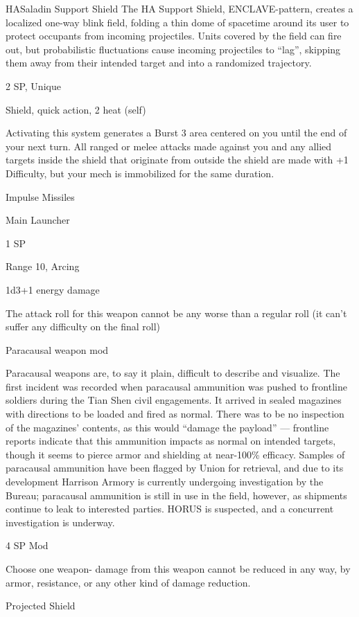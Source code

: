\begin{mech}{HA}{Saladin}
Support Shield
The HA Support Shield, ENCLAVE-pattern, creates a localized one-way blink field, folding a thin dome of spacetime around its user to protect occupants from incoming projectiles. Units covered by the field can fire out, but probabilistic fluctuations cause incoming projectiles to “lag”, skipping them away from their intended target and into a randomized trajectory.

2 SP, Unique

Shield, quick action, 2 heat (self)

Activating this system generates a Burst 3 area centered on you until the end of your next turn. All ranged or melee attacks made against you and any allied targets inside the shield that originate from outside the shield are made with +1 Difficulty, but your mech is immobilized for the same duration.


Impulse Missiles

Main Launcher

1 SP

Range 10, Arcing

1d3+1 energy damage

The attack roll for this weapon cannot be any worse than a regular roll (it can’t suffer any difficulty on the final roll)


Paracausal weapon mod

Paracausal weapons are, to say it plain, difficult to describe and visualize. The first incident was recorded when paracausal ammunition was pushed to frontline soldiers during the Tian Shen civil engagements. It arrived in sealed magazines with directions to be loaded and fired as normal. There was to be no inspection of the magazines’ contents, as this would “damage the payload” — frontline reports indicate that this ammunition impacts as normal on intended targets, though it seems to pierce armor and shielding at near-100\% efficacy. Samples of paracausal ammunition have been flagged by Union for retrieval, and due to its development Harrison Armory is currently undergoing investigation by the Bureau; paracausal ammunition is still in use in the field, however, as shipments continue to leak to interested parties. HORUS is suspected, and a concurrent investigation is underway.

4 SP
Mod

Choose one weapon- damage from this weapon cannot be reduced in any way, by armor, resistance, or any other kind of damage reduction.


Projected Shield


\end{mech}
